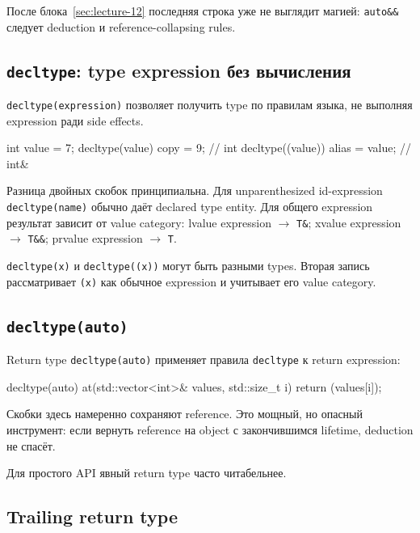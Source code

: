 После блока~\ref{sec:lecture-12} последняя строка уже не выглядит магией:
\texttt{auto\&\&} следует deduction и reference-collapsing rules.

\subsection{\texttt{decltype}: type expression без вычисления}

\texttt{decltype(expression)} позволяет получить type по правилам языка, не
выполняя expression ради side effects.

\begin{cppcode}
int value = 7;
decltype(value) copy = 9;   // int
decltype((value)) alias = value; // int&
\end{cppcode}

Разница двойных скобок принципиальна. Для unparenthesized id-expression
\texttt{decltype(name)} обычно даёт declared type entity. Для общего expression
результат зависит от value category:
lvalue expression $\rightarrow$ \texttt{T\&}; xvalue expression $\rightarrow$ \texttt{T\&\&}; prvalue expression $\rightarrow$ \texttt{T}.

\begin{mistakebox}
\texttt{decltype(x)} и \texttt{decltype((x))} могут быть разными types.
Вторая запись рассматривает \texttt{(x)} как обычное expression и учитывает его
value category.
\end{mistakebox}

\subsection{\texttt{decltype(auto)}}

Return type \texttt{decltype(auto)} применяет правила \texttt{decltype} к
return expression:

\begin{cppcode}
decltype(auto) at(std::vector<int>& values, std::size_t i) {
    return (values[i]);
}
\end{cppcode}

Скобки здесь намеренно сохраняют reference. Это мощный, но опасный инструмент:
если вернуть reference на object с закончившимся lifetime, deduction не спасёт.

Для простого API явный return type часто читабельнее.

\subsection{Trailing return type}

